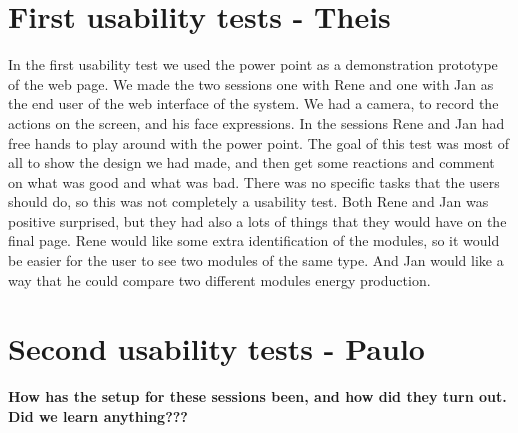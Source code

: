 \section{First usability tests - Theis}
In the first usability test we used the power point as a demonstration prototype of the web page. We made the two sessions one with Rene and one with Jan as the end user of the web interface of the system. We had a camera, to record the actions on the screen, and his face expressions. In the sessions Rene and Jan had free hands to play around with the power point. The goal of this test was most of all to show the design we had made, and then get some reactions and comment on what was good and what was bad. There was no specific tasks that the users should do, so this was not completely a usability test. Both Rene and Jan was positive surprised, but they had also a lots of things that they would have on the final page. Rene would like some extra identification of the modules, so it would be easier for the user to see two modules of the same type. And Jan would like a way that he could compare two different modules energy production.

\section{Second usability tests - Paulo}
\textbf{How has the setup for these sessions been, and how did they turn out. Did we learn anything???}

